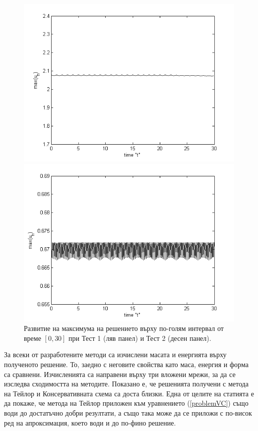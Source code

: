 \documentclass{article}
\newcommand{\rf}[1]{(\ref{#1})}
\begin{document}
\begin{figure}\vspace{0.2cm}
	\centering
	\begin{minipage}[b]{0.40\linewidth}
		\includegraphics[width=\linewidth]{../amitans/figures/maximum_30_T30_bt3_c045_h005.png}
	\end{minipage}	
	\begin{minipage}[b]{0.40\linewidth}
		 \includegraphics[width=\linewidth]{../amitans/figures/maximum_30_T30_bt1_c090_h020.png}
	\end{minipage}
\caption{Развитие на максимума на решението върху по-голям интервал от време $[0, 30]$ при Тест 1 (ляв панел) и Тест 2 (десен панел).}
\label{Maximum}
\end{figure}
\FloatBarrier
За всеки от разработените методи са изчислени масата и енергията върху полученото решение. То, заедно с неговите свойства като маса, енергия и форма са сравнени. Изчисленията са направени върху три вложени мрежи, за да се изследва сходимостта на методите. Показано е, че решенията получени с метода на Тейлор и Консервативната схема са доста близки. Една от целите на статията е да покаже, че метода на Тейлор приложен към уравнението \rf{problemVC} също води до достатъчно добри резултати, а също така може да се приложи с по-висок ред на апроксимация, което води и до по-фино решение.
\end{document}
